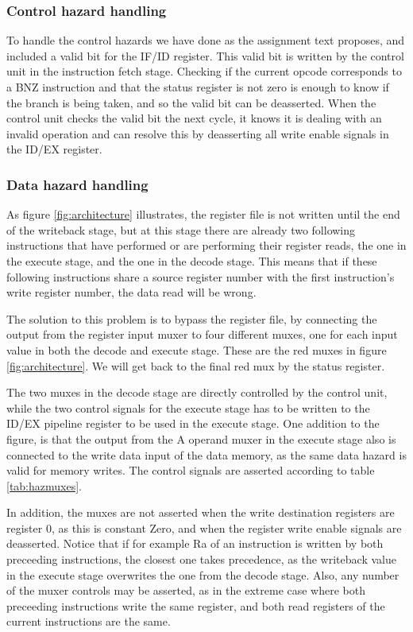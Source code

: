 \documentclass[11pt]{report}
\begin{document}
\subsubsection*{Control hazard handling}

To handle the control hazards we have done as the assignment text proposes, and included
a valid bit for the IF/ID register. This valid bit is written by the control unit in the
instruction fetch stage. Checking if the current opcode 
corresponds to a BNZ instruction and that the status register is not zero
is enough to know if the branch is being taken, and so the valid bit can be deasserted. 
When the control unit checks the valid bit the next cycle, it knows it is dealing with an 
invalid operation and can resolve this by deasserting all write enable signals in the 
ID/EX register.

\subsubsection*{Data hazard handling}

As figure \ref{fig:architecture}
illustrates, the register file is not written until the end of the 
writeback stage, but at this stage there are already two following instructions that
have performed or are performing their register reads, the one in the execute stage, 
and the one in the 
decode stage. This means that if these following instructions share a source register
number with the first instruction's write register number, the data read will be wrong. 

The solution to this problem is to bypass the register file, by connecting the output
from the register input muxer to four different muxes, one for each input value in both
the decode and execute stage. These are the red muxes in figure \ref{fig:architecture}.
We will get back to the final red mux by the status register. 

The two muxes in the
decode stage are directly controlled by the control unit, while the two control signals 
for the execute stage has to be written to the ID/EX pipeline register to be used in the 
execute stage. One addition to the figure, is that the output from the A operand muxer in 
the execute stage also is connected to the write data input of the data memory, as the
same data hazard is valid for memory writes. The control signals are asserted 
according to table \ref{tab:hazmuxes}. 

In addition, the muxes are not asserted when 
the write destination registers are register 0, 
as this is constant Zero, and when the register write enable signals are deasserted.
Notice that if for example Ra of an instruction is written by both preceeding 
instructions, the closest one takes precedence, as the writeback value in the
execute stage overwrites the one from the decode stage. Also, any number of the 
muxer controls may be asserted, as in the extreme case where both preceeding instructions
write the same register, and both read registers of the current instructions are the same.
\end{document}
